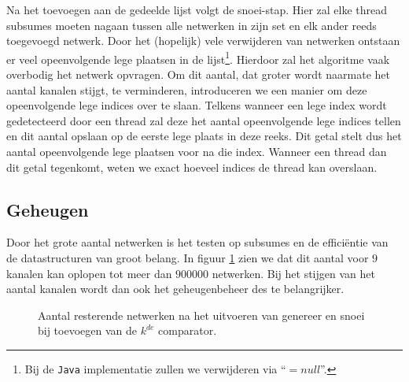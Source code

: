 \documentclass{article}
\begin{document}
Na het toevoegen aan de gedeelde lijst volgt de snoei-stap. Hier zal elke thread subsumes moeten nagaan tussen alle netwerken in zijn set en elk ander reeds toegevoegd netwerk.
Door het (hopelijk) vele verwijderen van netwerken ontstaan er veel opeenvolgende lege plaatsen in de lijst\footnote{Bij de \texttt{Java} implementatie zullen we verwijderen via  ``${= null}$''.}.
Hierdoor zal het algoritme vaak overbodig het netwerk opvragen.
Om dit aantal, dat groter wordt naarmate het aantal kanalen stijgt, te verminderen, introduceren we een manier om deze opeenvolgende lege indices over te slaan. 
Telkens wanneer een lege index wordt gedetecteerd door een thread zal deze het aantal opeenvolgende lege indices tellen en dit aantal opslaan op de eerste lege plaats in deze reeks.
Dit getal stelt dus het aantal opeenvolgende lege plaatsen voor na die index.
Wanneer een thread dan dit getal tegenkomt, weten we exact hoeveel indices de thread kan overslaan.

\subsection{Geheugen}\label{Geheugen}
Door het grote aantal netwerken is het testen op subsumes en de effici\"entie van de datastructuren van groot belang. In figuur \ref{netwerkVerloop9kanalen} zien we dat dit aantal voor $9$ kanalen kan oplopen tot meer dan $900000$ netwerken. Bij het stijgen van het aantal kanalen wordt dan ook het geheugenbeheer des te belangrijker.
\begin{figure}[!h]
	\centering
	\caption{Aantal resterende netwerken na het uitvoeren van genereer en snoei bij toevoegen van de $k^{de}$ comparator.}
	\label{netwerkVerloop9kanalen}
\end{figure}
\end{document}
